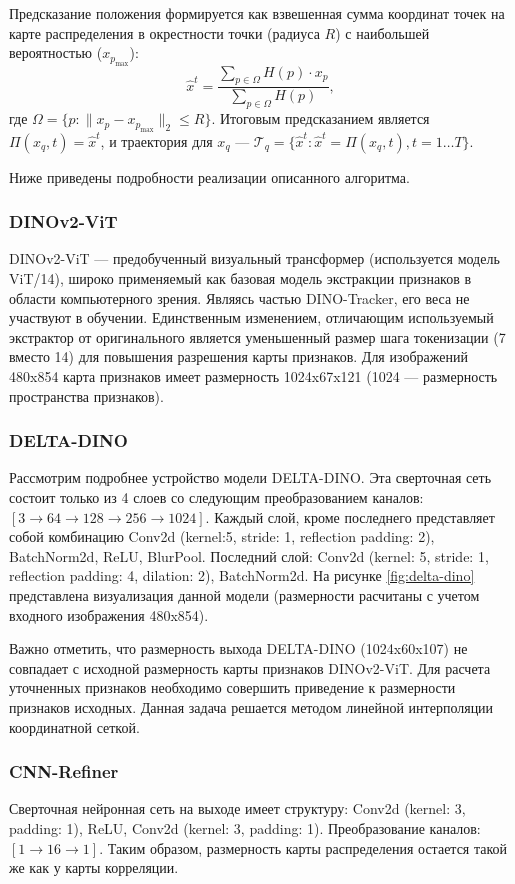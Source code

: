 \documentclass[a4paper, 14pt]{extarticle}
\theoremstyle{definition}
\theoremstyle{plain}
\theoremstyle{remark}
\begin{document}
Предсказание положения формируется как взвешенная сумма координат точек на карте распределения в окрестности точки (радиуса $R$) с наибольшей вероятностью ($x_{p_{\text{max}}}$):
\begin{equation}
	\hat{{x}}^t = \frac{\sum_{{p} \in \Omega} {H}({p}) \cdot {x}_{{p}}}{\sum_{{p} \in \Omega} {H}({p})},
\end{equation}
где \(\Omega = \{{p} : \|{x}_{{p}} - {x}_{{p}_{\text{max}}}\|_2 \leq R\}\). Итоговым предсказанием является \(\Pi({x}_q, t) = \hat{{x}}^t\), и траектория для \({x}_q\) --- \(\mathcal{T}_q = \{\hat{{x}}^t : \hat{{x}}^t = \Pi({x}_q, t), t = 1 \dots T\}\).

Ниже приведены подробности реализации описанного алгоритма.
\subsubsection{DINOv2-ViT}
DINOv2-ViT --- предобученный визуальный трансформер (используется модель ViT/14), широко применяемый как базовая модель экстракции признаков в области компьютерного зрения.
Являясь частью DINO-Tracker, его веса не участвуют в обучении. Единственным изменением, отличающим используемый экстрактор от оригинального является уменьшенный размер шага токенизации (7 вместо 14) для повышения разрешения карты признаков.
Для изображений 480x854 карта признаков имеет размерность 1024x67x121 (1024 --- размерность пространства признаков).
\subsubsection{DELTA-DINO}
Рассмотрим подробнее устройство модели DELTA-DINO. 
Эта сверточная сеть состоит только из 4 слоев со следующим преобразованием каналов: $[3 \to 64 \to 128 \to 256 \to 1024]$. 
Каждый слой, кроме последнего представляет собой комбинацию Conv2d (kernel:5, stride: 1, reflection padding: 2), BatchNorm2d, ReLU, BlurPool. 
Последний слой: Conv2d (kernel: 5, stride: 1, reflection padding: 4, dilation: 2), BatchNorm2d. 
На рисунке \ref{fig:delta-dino} представлена визуализация данной модели (размерности расчитаны с учетом входного изображения 480x854).

Важно отметить, что размерность выхода DELTA-DINO (1024x60x107) не совпадает с исходной размерность карты признаков DINOv2-ViT. Для расчета уточненных признаков необходимо совершить приведение к размерности признаков исходных. Данная задача решается методом линейной интерполяции координатной сеткой.

\subsubsection{CNN-Refiner}
Сверточная нейронная сеть на выходе имеет структуру: Conv2d (kernel: 3, padding: 1), ReLU, Conv2d (kernel: 3, padding: 1). Преобразование каналов: $[1 \to 16 \to 1]$. Таким образом, размерность карты распределения остается такой же как у карты корреляции.
\end{document}

